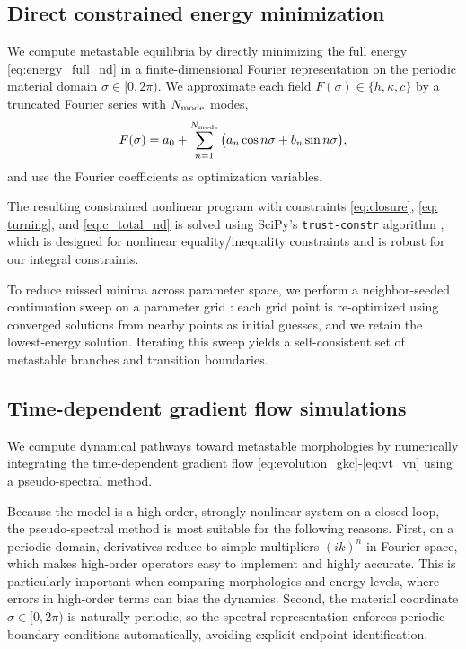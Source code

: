 \documentclass[
aip,
jcp,
reprint, 
floatfix
]{revtex4-1}
\begin{document}
\vspace{-10pt}
\subsection{Direct constrained energy minimization}\label{sec: trust_region}
We compute metastable equilibria by directly minimizing the full energy \eqref{eq:energy_full_nd}
in a finite-dimensional Fourier representation on the periodic material domain $\sigma\in[0,2\pi)$.
We approximate each field $F(\sigma)\in\{h,\kappa,c\}$ by a truncated Fourier series with $N_{\rm mode}$ modes,
\begin{equation}
F(\sigma)=a_0+\sum_{n=1}^{N_{\rm mode}}\big(a_n\cos n\sigma+b_n\sin n\sigma\big),
\end{equation}
and use the Fourier coefficients as optimization variables.

The resulting constrained nonlinear program with constraints \eqref{eq:closure}, \eqref{eq: turning}, and \eqref{eq:c_total_nd} is solved using SciPy's \verb|trust-constr| algorithm \cite{trust-constr}, which is designed for nonlinear equality/inequality constraints and is robust for our integral constraints.

To reduce missed minima across parameter space, we perform a neighbor-seeded continuation sweep on a parameter grid \cite{allgower2003introduction}: each grid point is re-optimized using converged solutions from nearby points as initial guesses, and we retain the lowest-energy solution. Iterating this sweep yields a self-consistent set of metastable branches and transition boundaries.

\vspace{-10pt}
\subsection{Time-dependent gradient flow simulations}\label{sec: pseudo}
We compute dynamical pathways toward metastable morphologies by numerically integrating the time-dependent gradient flow \eqref{eq:evolution_gkc}-\eqref{eq:vt_vn} using a pseudo-spectral method. 

Because the model is a high-order, strongly nonlinear system on a closed loop, the pseudo-spectral method is most suitable for the following reasons. 
First, on a periodic domain, derivatives reduce to simple multipliers $(ik)^n$ in Fourier space, which makes high-order operators easy to implement and highly accurate. This is particularly important when comparing morphologies and energy levels, where errors in high-order terms can bias the dynamics.
Second, the material coordinate $\sigma\in[0,2\pi)$ is naturally periodic, so the spectral representation enforces periodic boundary conditions automatically, avoiding explicit endpoint identification.
\end{document}
